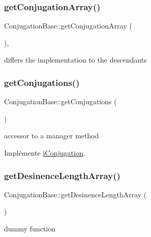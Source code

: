 \subsubsection{\texorpdfstring{get\+Conjugation\+Array()}{getConjugationArray()}}
{\footnotesize\ttfamily Conjugation\+Base\+::get\+Conjugation\+Array (\begin{DoxyParamCaption}{ }\end{DoxyParamCaption})\hspace{0.3cm}{\ttfamily [abstract]}, {\ttfamily [protected]}}

differs the implementation to the descendants \hypertarget{classConjugationBase_ae5b10d1201dfc7ed1c56b1f5a073bbdb}{}\label{classConjugationBase_ae5b10d1201dfc7ed1c56b1f5a073bbdb} 
\subsubsection{\texorpdfstring{get\+Conjugations()}{getConjugations()}}
{\footnotesize\ttfamily Conjugation\+Base\+::get\+Conjugations (\begin{DoxyParamCaption}{ }\end{DoxyParamCaption})}

accessor to a manager method 

Implémente \hyperlink{interfaceiConjugation_a6c0072d898eb8b2f3756c87dfed4af33}{i\+Conjugation}.

\hypertarget{classConjugationBase_a9b0524f2dde45dcdc8f6c27d673c827a}{}\label{classConjugationBase_a9b0524f2dde45dcdc8f6c27d673c827a} 
\subsubsection{\texorpdfstring{get\+Desinence\+Length\+Array()}{getDesinenceLengthArray()}}
{\footnotesize\ttfamily Conjugation\+Base\+::get\+Desinence\+Length\+Array (\begin{DoxyParamCaption}{ }\end{DoxyParamCaption})\hspace{0.3cm}{\ttfamily [protected]}}



dummy function 

